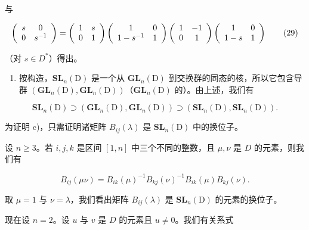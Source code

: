与

\[
\left( \begin{array}{c c} s & 0 \\ 0 & s ^ {- 1} \end{array} \right) = \left( \begin{array}{c c} 1 & s \\ 0 & 1 \end{array} \right) \left( \begin{array}{c c} 1 & 0 \\ 1 - s ^ {- 1} & 1 \end{array} \right) \left( \begin{array}{c c} 1 & - 1 \\ 0 & 1 \end{array} \right) \left( \begin{array}{c c} 1 & 0 \\ 1 - s & 1 \end{array} \right)\tag{29}
\]

（对 \(s \in D^{*}\)）得出。

\begin{enumerate}
\def\labelenumi{\Alph{enumi})}
\setcounter{enumi}{1}
\tightlist
\item
  按构造，\(\mathbf{SL}_{n}(\mathrm{D})\) 是一个从 \(\mathbf{GL}_{n}(\mathrm{D})\) 到交换群的同态的核，所以它包含导群 \((\mathbf{GL}_{n}(\mathrm{D}),\mathbf{GL}_{n}(\mathrm{D}))\)（\(\mathbf{GL}_{n}(\mathrm{D})\) 的）。由上述，我们有
\end{enumerate}

\[
\mathbf {S L} _ {n} (\mathrm{D}) \supset (\mathbf {G L} _ {n} (\mathrm{D}), \mathbf {G L} _ {n} (\mathrm{D})) \supset (\mathbf {S L} _ {n} (\mathrm{D}), \mathbf {S L} _ {n} (\mathrm{D})).
\]

为证明 c)，只需证明诸矩阵 \(B_{ij}(\lambda)\) 是 \(\mathbf{SL}_n(\mathrm{D})\) 中的换位子。

设 \(n \geqslant 3\)。若 \(i, j, k\) 是区间 \([1, n]\) 中三个不同的整数，且 \(\mu, \nu\) 是 \(D\) 的元素，则我们有

\[
B _ {i j} (\mu \nu) = B _ {i k} (\mu) ^ {- 1} B _ {k j} (\nu) ^ {- 1} B _ {i k} (\mu) B _ {k j} (\nu).\tag{30}
\]

取 \(\mu = 1\) 与 \(\nu = \lambda\)，我们看出矩阵 \(B_{ij}(\lambda)\) 是 \(\mathbf{SL}_n(\mathrm{D})\) 的元素的换位子。

现在设 \(n = 2\)。设 \(u\) 与 \(v\) 是 \(D\) 的元素且 \(u \neq 0\)。我们有关系式

